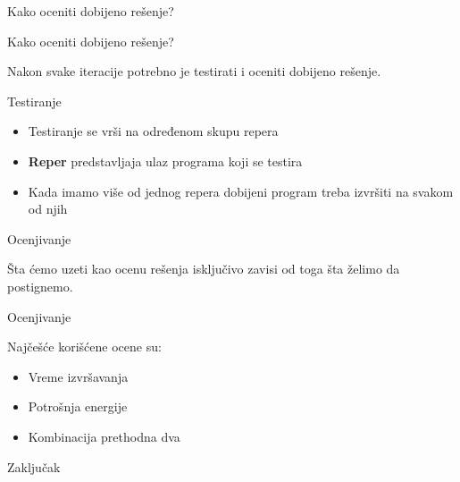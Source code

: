 \documentclass[10pt]{beamer}
\begin{document}
\begin{frame}[standout]
  Kako oceniti dobijeno rešenje?
\end{frame}

\begin{frame}{Kako oceniti dobijeno rešenje?}
  
  Nakon svake iteracije potrebno je testirati i oceniti dobijeno rešenje.

\end{frame}

\begin{frame}{Testiranje}

  \begin{itemize}[<+- | alert@+>]
    \item Testiranje se vrši na određenom skupu repera
    \item \textbf{Reper} predstavljaja ulaz programa koji se testira
    \item Kada imamo više od jednog repera dobijeni program treba izvršiti na svakom od njih
  \end{itemize}

\end{frame}

\begin{frame}{Ocenjivanje}

   Šta ćemo uzeti kao ocenu rešenja isključivo zavisi od toga šta želimo da postignemo.

\end{frame}

\begin{frame}{Ocenjivanje}

    Najčešće korišćene ocene su:
    \begin{itemize} 
      \item Vreme izvršavanja
      \item Potrošnja energije
      \item Kombinacija prethodna dva
    \end{itemize}

\end{frame}

\begin{frame}[standout]
  Zaključak
\end{frame}

%
%
\end{document}
